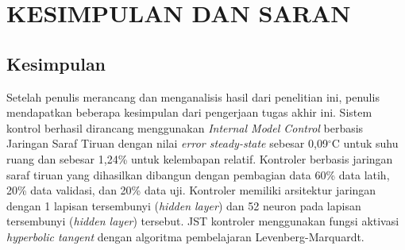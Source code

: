 \chapter{KESIMPULAN DAN SARAN}
\label{kesimpulan-dan-saran}



\section{Kesimpulan}

Setelah penulis merancang dan menganalisis hasil dari penelitian ini, penulis mendapatkan beberapa kesimpulan dari pengerjaan tugas akhir ini. Sistem kontrol berhasil dirancang menggunakan \textit{Internal Model Control} berbasis Jaringan Saraf Tiruan dengan nilai \textit{error steady-state} sebesar 0,09$^\circ$C untuk suhu ruang dan sebesar 1,24\% untuk kelembapan relatif. Kontroler berbasis jaringan saraf tiruan yang dihasilkan dibangun dengan pembagian data 60\% data latih, 20\% data validasi, dan 20\% data uji. Kontroler memiliki arsitektur jaringan dengan 1 lapisan tersembunyi (\textit{hidden layer}) dan 52 neuron pada lapisan tersembunyi (\textit{hidden layer}) tersebut. JST kontroler menggunakan fungsi aktivasi \textit{hyperbolic tangent} dengan algoritma pembelajaran Levenberg-Marquardt.

 


